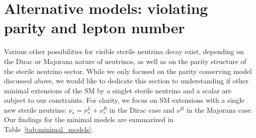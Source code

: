 \documentclass[
reprint,
superscriptaddress,
showpacs,
preprintnumbers,
nofootinbib,
nobibnotes,
amsmath,
amssymb, 
aps,
prd,
floatfix
]{revtex4-1}
\newcommand{\reftab}[1]{Table~\ref{#1}}
\begin{document}
\section{Alternative models: violating parity and lepton number}
\label{sec:alternatives}
Various other possibilities for visible sterile neutrino decay exist, depending on the Dirac or Majorana nature of neutrinos, as well as on the parity structure of the sterile neutrino sector. While we only focused on the parity conserving model discussed above, we would like to dedicate this section to understanding if other minimal extensions of the SM by a singlet sterile neutrino and a scalar are subject to our constraints. For clarity, we focus on SM extensions with a single new sterile neutrino: $\nu_s=\nu_s^L + \nu_s^R$ in the Dirac case and $\nu^R$ in the Majorana case. Our findings for the minimal models are summarized in \reftab{tab:minimal_models}.
\end{document}
